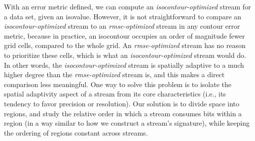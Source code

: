With an error metric defined, we can compute an \emph{isocontour-optimized} stream for a data set,
given an isovalue. However, it is not straightforward to compare an \emph{isocontour-optimized}
stream to an \emph{rmse-optimized} stream in any contour error metric, because in practice, an
isocontour occupies an order of magnitude fewer grid cells, compared to the whole grid. An
\emph{rmse-optimized} stream has no reason to prioritize these cells, which is what an
\emph{isocontour-optimized} stream would do. In other words, the \emph{isocontour-optimized} stream
is spatially adaptive to a much higher degree than the \emph{rmse-optimized} stream is, and this
makes a direct comparison less meaningful. One way to solve this problem is to isolate the spatial
adaptivity aspect of a stream from its core characteristics (i.e., its tendency to favor precision
or resolution). Our solution is to divide space into regions, and study the relative order in which
a stream consumes bits within a region (in a way similar to how we construct a stream's signature),
while keeping the ordering of regions constant across streams.

